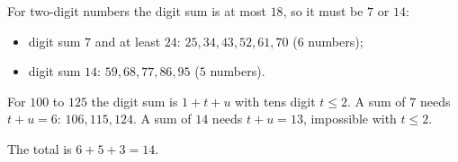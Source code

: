 For two-digit numbers the digit sum is at most $18$, so it must be $7$ or $14$:
\begin{itemize}
\item digit sum $7$ and at least $24$: $25,34,43,52,61,70$ ($6$ numbers);
\item digit sum $14$: $59,68,77,86,95$ ($5$ numbers).
\end{itemize}
For $100$ to $125$ the digit sum is $1+t+u$ with tens digit $t\le2$. A sum of $7$ needs $t+u=6$: $106,115,124$. A sum of $14$ needs $t+u=13$, impossible with $t\le2$.

The total is $6+5+3=\boxed{14}$.
